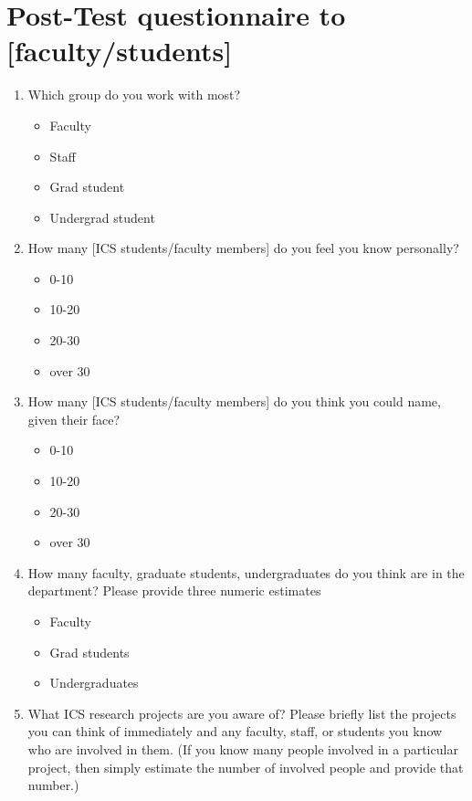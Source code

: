 \section{Post-Test questionnaire to [faculty/students]}
\label{Post-Test}
\begin{enumerate}

\item{Which group do you work with most?}
  \begin{itemize}
  \item{Faculty}
  \item{Staff}
  \item{Grad student}
  \item{Undergrad student}
  \end{itemize}

\item{How many [ICS students/faculty members] do you feel you know
  personally?}
  \begin{itemize}
  \item{0-10}
  \item{10-20}
  \item{20-30}
  \item{over 30}
  \end{itemize}

\item{How many [ICS students/faculty members] do you think you could name,
  given their face?}
  \begin{itemize}
  \item{0-10}
  \item{10-20}
  \item{20-30}
  \item{over 30}
  \end{itemize}

\item{How many faculty, graduate students, undergraduates do you think are
  in the department?  Please provide three numeric estimates}
  \begin{itemize}
  \item{Faculty}
  \item{Grad students}
  \item{Undergraduates}
  \end{itemize}

\item{What ICS research projects are you aware of?  Please briefly list the
  projects you can think of immediately and any faculty, staff, or students
  you know who are involved in them. (If you know many people involved in a
  particular project, then simply estimate the number of involved people
  and provide that number.)}


\end{enumerate}
